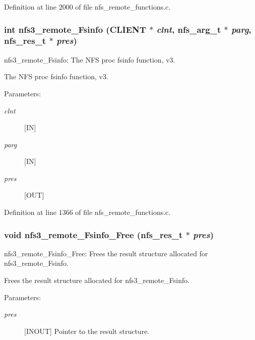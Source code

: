 Definition at line 2000 of file nfs\_\-remote\_\-functions.c.
\subsubsection[{nfs3\_\-remote\_\-Fsinfo}]{\setlength{\rightskip}{0pt plus 5cm}int nfs3\_\-remote\_\-Fsinfo (CLIENT $\ast$ {\em clnt}, \/  nfs\_\-arg\_\-t $\ast$ {\em parg}, \/  nfs\_\-res\_\-t $\ast$ {\em pres})}\label{group__NFSprocs_g9010b5e8cfcb6fb7c0f94251be57fbf9}


nfs3\_\-remote\_\-Fsinfo: The NFS proc fsinfo function, v3.

The NFS proc fsinfo function, v3.

\begin{Desc}
\item[Parameters:]
\begin{description}
\item[{\em clnt}][IN] \item[{\em parg}][IN] \item[{\em pres}][OUT] \end{description}
\end{Desc}


Definition at line 1366 of file nfs\_\-remote\_\-functions.c.
\subsubsection[{nfs3\_\-remote\_\-Fsinfo\_\-Free}]{\setlength{\rightskip}{0pt plus 5cm}void nfs3\_\-remote\_\-Fsinfo\_\-Free (nfs\_\-res\_\-t $\ast$ {\em pres})}\label{group__NFSprocs_g0c270f30654ac2837e95465706aa69e3}


nfs3\_\-remote\_\-Fsinfo\_\-Free: Frees the result structure allocated for nfs3\_\-remote\_\-Fsinfo.

Frees the result structure allocated for nfs3\_\-remote\_\-Fsinfo.

\begin{Desc}
\item[Parameters:]
\begin{description}
\item[{\em pres}][INOUT] Pointer to the result structure. \end{description}
\end{Desc}


